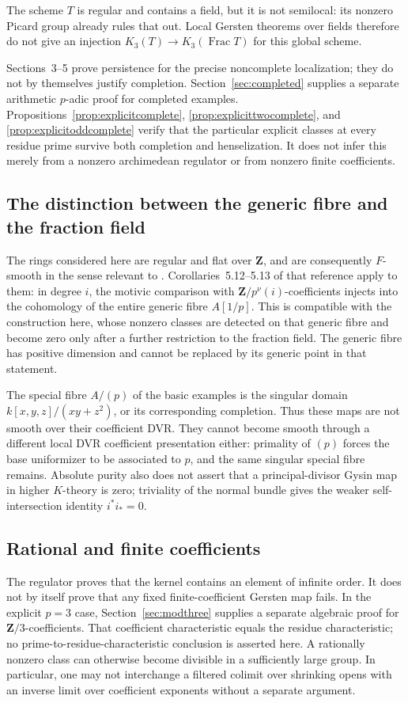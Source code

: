 \documentclass[11pt,a4paper]{article}
\theoremstyle{remark}
\newcommand{\Z}{\mathbf Z}
\newcommand{\Frac}{\operatorname{Frac}}
\begin{document}
The scheme $T$ is regular and contains a field, but it is not semilocal: its nonzero Picard group already rules that out. Local Gersten theorems over fields therefore do not give an injection $K_3(T)\to K_3(\Frac T)$ for this global scheme.

Sections~3--5 prove persistence for the precise noncomplete localization; they do not by themselves justify completion. Section~\ref{sec:completed} supplies a separate arithmetic $p$-adic proof for completed examples. Propositions~\ref{prop:explicitcomplete}, \ref{prop:explicittwocomplete}, and \ref{prop:explicitoddcomplete} verify that the particular explicit classes at every residue prime survive both completion and henselization. It does not infer this merely from a nonzero archimedean regulator or from nonzero finite coefficients.

\subsection{The distinction between the generic fibre and the fraction field}
The rings considered here are regular and flat over $\Z$, and are consequently $F$-smooth in the sense relevant to \cite{BouisMotivic}. Corollaries~5.12--5.13 of that reference apply to them: in degree $i$, the motivic comparison with $\Z/p^\nu(i)$-coefficients injects into the cohomology of the entire generic fibre $A[1/p]$. This is compatible with the construction here, whose nonzero classes are detected on that generic fibre and become zero only after a further restriction to the fraction field. The generic fibre has positive dimension and cannot be replaced by its generic point in that statement.

The special fibre $A/(p)$ of the basic examples is the singular domain $k[x,y,z]/(xy+z^2)$, or its corresponding completion. Thus these maps are not smooth over their coefficient DVR. They cannot become smooth through a different local DVR coefficient presentation either: primality of $(p)$ forces the base uniformizer to be associated to $p$, and the same singular special fibre remains. Absolute purity also does not assert that a principal-divisor Gysin map in higher $K$-theory is zero; triviality of the normal bundle gives the weaker self-intersection identity $i^*i_*=0$.

\subsection{Rational and finite coefficients}
The regulator proves that the kernel contains an element of infinite order. It does not by itself prove that any fixed finite-coefficient Gersten map fails. In the explicit $p=3$ case, Section~\ref{sec:modthree} supplies a separate algebraic proof for $\Z/3$-coefficients. That coefficient characteristic equals the residue characteristic; no prime-to-residue-characteristic conclusion is asserted here. A rationally nonzero class can otherwise become divisible in a sufficiently large group. In particular, one may not interchange a filtered colimit over shrinking opens with an inverse limit over coefficient exponents without a separate argument.
\end{document}
